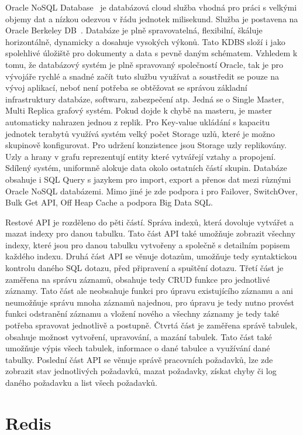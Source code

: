 \documentclass[czech,master,dept460,male,csharp,cpdeclaration]{diploma}
\begin{document}
	Oracle NoSQL Database~\cite{oraclenosqldb} je databázová cloud služba vhodná pro práci s velkými objemy dat a nízkou odezvou v řádu jednotek milisekund. Služba je postavena na Oracle Berkeley DB~\cite{berkeleydb}. Databáze je plně spravovatelná, flexibilní, škáluje horizontálně, dynamicky a dosahuje vysokých výkonů. Tato KDBS složí i jako spolehlivé úložiště pro dokumenty a data s pevně daným schématem. Vzhledem k tomu, že databázový systém je plně spravovaný společností Oracle, tak je pro vývojáře rychlé a snadné začít tuto službu využívat a soustředit se pouze na vývoj aplikací, neboť není potřeba se obtěžovat se správou základní infrastruktury databáze, softwaru, zabezpečení atp. Jedná se o Single Master, Multi Replica grafový systém. Pokud dojde k chybě na masteru, je master automaticky nahrazen jednou z replik. Pro Key-value ukládání s kapacitu jednotek terabytů využívá systém velký počet Storage uzlů, které je možno skupinově konfigurovat. Pro udržení konzistence jsou Storage uzly replikovány. Uzly a hrany v grafu reprezentují entity které vytvářejí vztahy a propojení. Sdílený systém, uniformně alokuje data okolo ostatních částí skupin. Databáze obsahuje i SQL Query s jazykem pro import, export a přenos dat mezi různými Oracle NoSQL databázemi. Mimo jiné je zde podpora i pro Failover, SwitchOver, Bulk Get API, Off Heap Cache a podpora Big Data SQL.
	
	Restové API je rozděleno do pěti částí. Správa indexů, která dovoluje vytvářet a mazat indexy pro danou tabulku. Tato část API také umožňuje zobrazit všechny indexy, které jsou pro danou tabulku vytvořeny a společně s detailním popisem každého indexu. Druhá část API se věnuje dotazům, umožňuje tedy syntaktickou kontrolu daného SQL dotazu, před připravení a spuštění dotazu. Třetí část je zaměřena na správu záznamů, obsahuje tedy CRUD funkce pro jednotlivé záznamy. Tato část ale neobsahuje funkci pro úpravu existujícího záznamu a ani neumožňuje správu mnoha záznamů najednou, pro úpravu je tedy nutno provést funkci odstranění záznamu a vložení nového a všechny záznamy je tedy také potřeba spravovat jednotlivě a postupně. Čtvrtá část je zaměřena správě tabulek, obsahuje možnost vytvoření, upravování, a mazání tabulek. Tato část také umožňuje výpis všech tabulek, informace o dané tabulce a využívání dané tabulky. Poslední část API se věnuje správě pracovních požadavků, lze zde zobrazit stav jednotlivých požadavků, mazat požadavky, získat chyby či log daného požadavku a list všech požadavků.
		
	\section{Redis} \label{lab-redis}
	
\end{document}

